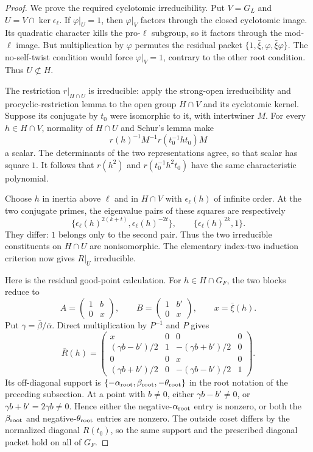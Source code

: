 \begin{proof}
We prove the required cyclotomic irreducibility.
Put \(V=G_L\) and \(U=V\cap\ker\epsilon_\ell\).
If \(\varphi|_U=1\), then \(\varphi|_V\) factors through the
closed cyclotomic image.
Its quadratic character kills the pro-\(\ell\) subgroup, so
it factors through the mod-\(\ell\) image.
But multiplication by \(\varphi\) permutes the residual packet
\(\{1,\bar\xi,\varphi,\bar\xi\varphi\}\).
The no-self-twist condition would force \(\varphi|_V=1\),
contrary to the other root condition.
Thus \(U\not\subset H\).

The restriction \(r|_{H\cap U}\) is irreducible:
apply the strong-open irreducibility and procyclic-restriction
lemma to the open group \(H\cap V\) and its cyclotomic kernel.
Suppose its conjugate by \(t_0\) were isomorphic to it, with
intertwiner \(M\).
For every \(h\in H\cap V\), normality of \(H\cap U\) and
Schur's lemma make
\[
 r(h)^{-1}M^{-1}r(t_0^{-1}ht_0)M
\]
a scalar. The determinants of the two representations agree,
so that scalar has square \(1\).
It follows that \(r(h^2)\) and \(r(t_0^{-1}h^2t_0)\) have
the same characteristic polynomial.

Choose \(h\) in inertia above \(\ell\) and in \(H\cap V\)
with \(\epsilon_\ell(h)\) of infinite order.
At the two conjugate primes, the eigenvalue pairs of these
squares are respectively
\[
 \{\epsilon_\ell(h)^{2(k+t)},\epsilon_\ell(h)^{-2t}\},
 \qquad
 \{\epsilon_\ell(h)^{2k},1\}.
\]
They differ: \(1\) belongs only to the second pair.
Thus the two irreducible constituents on \(H\cap U\) are
nonisomorphic.
The elementary index-two induction criterion now gives
\(R|_U\) irreducible.

Here is the residual good-point calculation.
For \(h\in H\cap G_F\), the two blocks reduce to
\[
 A=\begin{pmatrix}1&b\\0&x\end{pmatrix},\qquad
 B=\begin{pmatrix}1&b'\\0&x\end{pmatrix},
 \qquad x=\bar\xi(h).
\]
Put \(\gamma=\bar\beta/\bar\alpha\).
Direct multiplication by \(P^{-1}\) and \(P\) gives
\[
 \bar R(h)=
 \begin{pmatrix}
 x&0&0&0\\
 (\gamma b-b')/2&1&-(\gamma b+b')/2&0\\
 0&0&x&0\\
 (\gamma b+b')/2&0&-(\gamma b-b')/2&1
 \end{pmatrix}.
\]
Its off-diagonal support is
\(\{-\alpha_{\rm root},\beta_{\rm root},-\theta_{\rm root}\}\)
in the root notation of the preceding subsection.
At a point with \(b\ne0\), either \(\gamma b-b'\ne0\),
or \(\gamma b+b'=2\gamma b\ne0\).
Hence either the negative-\(\alpha_{\rm root}\) entry is
nonzero, or both the \(\beta_{\rm root}\) and
negative-\(\theta_{\rm root}\) entries are nonzero.
The outside coset differs by the normalized diagonal
\(R(t_0)\), so the same support and the prescribed diagonal
packet hold on all of \(G_F\).


\end{proof}
